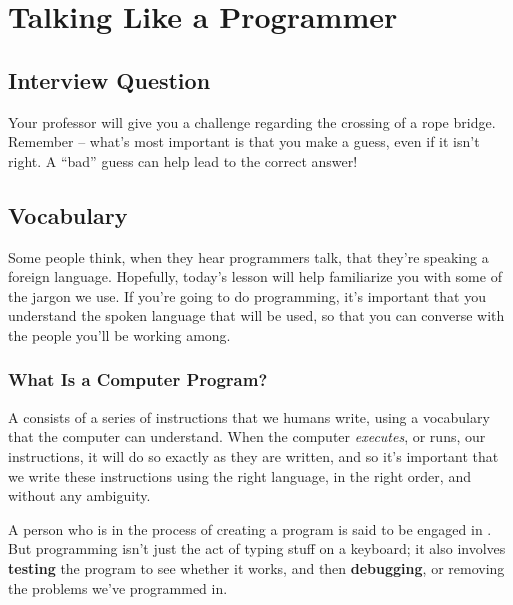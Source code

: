 
\setcounter{chapter}{1}
\chapter{Talking Like a Programmer}
\label{day:vocabulary}


\minitoc

\section{Interview Question}

Your professor will give you a challenge regarding the crossing of a rope bridge.  Remember -- what's most important is that you make a guess, even if it isn't right.  A ``bad'' guess can help lead to the correct answer!

\section{Vocabulary}

Some people think, when they hear programmers talk, that they're speaking a foreign language.  Hopefully, today's lesson will help familiarize you with some of the jargon we use.  If you're going to do programming, it's important that you understand the spoken language that will be used, so that you can converse with the people you'll be working among.

\subsection{What Is a Computer Program?}

A  consists of a series of instructions that we humans write, using a vocabulary that the computer can understand.  When the computer \textit{executes}, or runs, our instructions, it will do so exactly as they are written, and so it's important that we write these instructions using the right language, in the right order, and without any ambiguity.

A person who is in the process of creating a program is said to be engaged in .  But programming isn't just the act of typing stuff on a keyboard; it also involves \textbf{testing} the program to see whether it works, and then \textbf{debugging}, or removing the problems we've programmed in.

